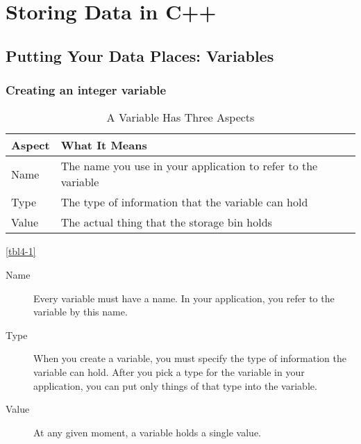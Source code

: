 \chapter{Storing Data in C++}
\section{Putting Your Data Places: Variables}
\subsection{Creating an integer variable}
\begin{table}
    \centering
    \caption{A Variable Has Three Aspects}
    \label{tbl4-1}
    \begin{tabular}{ll}
        \hline
        Aspect & What It Means                                                 \\
        \hline
        Name   & The name you use in your application to refer to the variable \\
        Type   & The type of information that the variable can hold            \\
        Value  & The actual thing that the storage bin holds                   \\
        \hline
    \end{tabular}
\end{table}
\autoref{tbl4-1}
\begin{description}
    \item[Name] Every variable must have a name. In your application, you refer to the variable by this name.
    \item[Type] When you create a variable, you must specify the type of information the variable can hold. After you pick a type for the variable in your application, you can put only things of that type into the variable.
    \item[Value] At any given moment, a variable holds a single value.
\end{description}